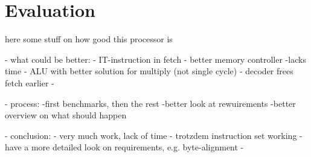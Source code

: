 \chapter{Evaluation}
\label{cha:evaluation}

here some stuff on how good this processor is

- what could be better:
  - IT-instruction in fetch
  - better memory controller -lacks time
  - ALU with better solution for multiply (not single cycle)
  - decoder frees fetch earlier
  - 
  
  - process:
    -first benchmarks, then the rest
    -better look at rewuirements
    -better overview on what should happen
    
- conclusion:
  - very much work, lack of time
  - trotzdem instruction set working
  - have a more detailed look on requirements, e.g. byte-alignment
  - 
  